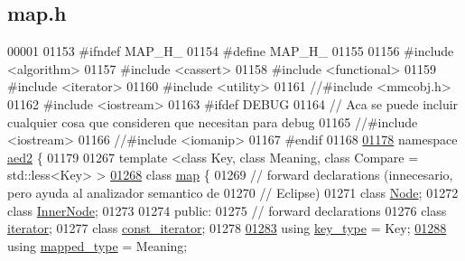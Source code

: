 \hypertarget{map_8h_source}{}\subsection{map.\+h}

\begin{DoxyCode}
00001 
01153 \textcolor{preprocessor}{#ifndef MAP\_H\_}
01154 \textcolor{preprocessor}{#define MAP\_H\_}
01155 
01156 \textcolor{preprocessor}{#include <algorithm>}
01157 \textcolor{preprocessor}{#include <cassert>}
01158 \textcolor{preprocessor}{#include <functional>}
01159 \textcolor{preprocessor}{#include <iterator>}
01160 \textcolor{preprocessor}{#include <utility>}
01161 \textcolor{comment}{//#include <mmcobj.h>}
01162 \textcolor{preprocessor}{#include <iostream>}
01163 \textcolor{preprocessor}{#ifdef DEBUG}
01164 \textcolor{comment}{// Aca se puede incluir cualquier cosa que consideren que necesitan para debug}
01165 \textcolor{comment}{//#include <iostream>}
01166 \textcolor{comment}{//#include <iomanip>}
01167 \textcolor{preprocessor}{#endif}
01168 
\hypertarget{map_8h_source.tex_l01178}{}\hyperlink{namespaceaed2}{01178} \textcolor{keyword}{namespace }\hyperlink{namespaceaed2}{aed2} \{
01179 
01267     \textcolor{keyword}{template} <\textcolor{keyword}{class} Key, \textcolor{keyword}{class} Meaning, \textcolor{keyword}{class} Compare = std::less<Key> >
\hypertarget{map_8h_source.tex_l01268}{}\hyperlink{classaed2_1_1map}{01268}     \textcolor{keyword}{class }\hyperlink{classaed2_1_1map}{map} \{
01269         \textcolor{comment}{// forward declarations (innecesario, pero ayuda al analizador semantico de}
01270         \textcolor{comment}{// Eclipse)}
01271         \textcolor{keyword}{class }\hyperlink{structaed2_1_1map_1_1Node}{Node};
01272         \textcolor{keyword}{class }\hyperlink{structaed2_1_1map_1_1InnerNode}{InnerNode};
01273 
01274     \textcolor{keyword}{public}:
01275         \textcolor{comment}{// forward declarations}
01276         \textcolor{keyword}{class }\hyperlink{classaed2_1_1map_1_1iterator}{iterator};
01277         \textcolor{keyword}{class }\hyperlink{classaed2_1_1map_1_1const__iterator}{const\_iterator};
01278 
\hypertarget{map_8h_source.tex_l01283}{}\hyperlink{classaed2_1_1map_a4273e8812e7105a618df58a2c8b72b7d_a4273e8812e7105a618df58a2c8b72b7d}{01283}         \textcolor{keyword}{using} \hyperlink{classaed2_1_1map_a4273e8812e7105a618df58a2c8b72b7d_a4273e8812e7105a618df58a2c8b72b7d}{key\_type} = Key;
\hypertarget{map_8h_source.tex_l01288}{}\hyperlink{classaed2_1_1map_aa3e34bf624f3009884a71b18f4ddae40_aa3e34bf624f3009884a71b18f4ddae40}{01288}         \textcolor{keyword}{using} \hyperlink{classaed2_1_1map_aa3e34bf624f3009884a71b18f4ddae40_aa3e34bf624f3009884a71b18f4ddae40}{mapped\_type} = Meaning;

\end{DoxyCode}
